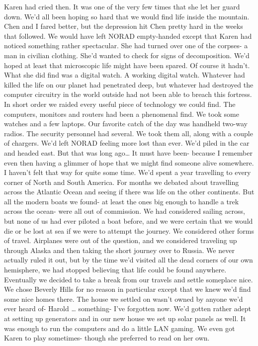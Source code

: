 \documentclass[a4paper]{article}
\begin{document}
Karen had cried then. It was one of the very few times that she let her guard down. We’d all been hoping so hard that we would find life inside the mountain. Chen and I fared better, but the depression hit Chen pretty hard in the weeks that followed.
We would have left NORAD empty-handed except that Karen had noticed something rather spectacular. She had turned over one of the corpses- a man in civilian clothing. She’d wanted to check for signs of decomposition. We’d hoped at least that microscopic life might have been spared. Of course it hadn’t. What she did find was a digital watch. A working digital watch.
Whatever had killed the life on our planet had penetrated deep, but whatever had destroyed the computer circuitry in the world outside had not been able to breach this fortress. In short order we raided every useful piece of technology we could find. The computers, monitors and routers had been a phenomenal find. We took some watches and a few laptops. Our favorite catch of the day was handheld two-way radios. The security personnel had several. We took them all, along with a couple of chargers.
We’d left NORAD feeling more lost than ever. We’d piled in the car and headed east. But that was long ago… It must have been- because I remember even then having a glimmer of hope that we might find someone alive somewhere. I haven’t felt that way for quite some time.
We’d spent a year travelling to every corner of North and South America. For months we debated about travelling across the Atlantic Ocean and seeing if there was life on the other continents. But all the modern boats we found- at least the ones big enough to handle a trek across the ocean- were all out of commission.
We had considered sailing across, but none of us had ever piloted a boat before, and we were certain that we would die or be lost at sea if we were to attempt the journey. We considered other forms of travel. Airplanes were out of the question, and we considered traveling up through Alaska and then taking the short journey over to Russia. We never actually ruled it out, but by the time we’d visited all the dead corners of our own hemisphere, we had stopped believing that life could be found anywhere.
Eventually we decided to take a break from our travels and settle someplace nice. We chose Beverly Hills for no reason in particular except that we knew we’d find some nice homes there. The house we settled on wasn’t owned by anyone we’d ever heard of- Harold … something- I’ve forgotten now.
We’d gotten rather adept at setting up generators and in our new house we set up solar panels as well. It was enough to run the computers and do a little LAN gaming. We even got Karen to play sometimes- though she preferred to read on her own.
\end{document}
